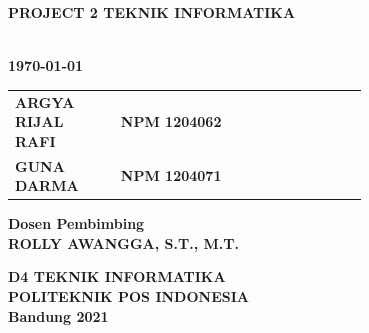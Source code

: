 \begin{flushleft}

  \sffamily

  \noindent\textbf{PROJECT 2 TEKNIK INFORMATIKA}
  \vspace{4ex}

   \\
  \textbf{\today}
  \vspace{6ex}

  \vspace{6ex}

  \begin{adjustwidth}{-2mm}{}
    \begin{tabular}{lcp{0.7\linewidth}}
      \textbf{ARGYA RIJAL RAFI} & & \textbf{NPM 1204062} \\
      \textbf{GUNA DARMA} & & \textbf{NPM 1204071} \\
    \end{tabular}
  \end{adjustwidth}
  \vspace{4ex}

  \noindent
  \textbf{Dosen Pembimbing} \\
  \textbf{ROLLY AWANGGA, S.T., M.T.}
  \vspace{10ex}

  \textbf{D4 TEKNIK INFORMATIKA} \\
  \textbf{POLITEKNIK POS INDONESIA} \\
  \textbf{Bandung 2021}

\end{flushleft}

\restoregeometry
